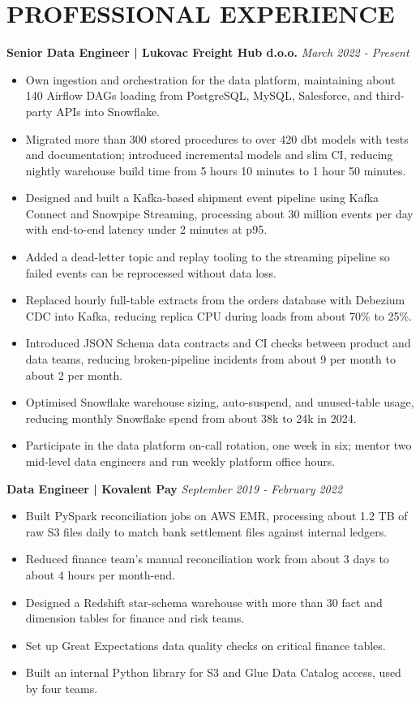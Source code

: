\documentclass[11pt,a4paper]{article}
\begin{document}
\section*{PROFESSIONAL EXPERIENCE}
\textbf{Senior Data Engineer | Lukovac Freight Hub d.o.o.} \hfill \textit{March 2022 - Present}
\begin{itemize}
\item Own ingestion and orchestration for the data platform, maintaining about 140 Airflow DAGs loading from PostgreSQL, MySQL, Salesforce, and third-party APIs into Snowflake.
\item Migrated more than 300 stored procedures to over 420 dbt models with tests and documentation; introduced incremental models and slim CI, reducing nightly warehouse build time from 5 hours 10 minutes to 1 hour 50 minutes.
\item Designed and built a Kafka-based shipment event pipeline using Kafka Connect and Snowpipe Streaming, processing about 30 million events per day with end-to-end latency under 2 minutes at p95.
\item Added a dead-letter topic and replay tooling to the streaming pipeline so failed events can be reprocessed without data loss.
\item Replaced hourly full-table extracts from the orders database with Debezium CDC into Kafka, reducing replica CPU during loads from about 70\% to 25\%.
\item Introduced JSON Schema data contracts and CI checks between product and data teams, reducing broken-pipeline incidents from about 9 per month to about 2 per month.
\item Optimised Snowflake warehouse sizing, auto-suspend, and unused-table usage, reducing monthly Snowflake spend from about 38k to 24k in 2024.
\item Participate in the data platform on-call rotation, one week in six; mentor two mid-level data engineers and run weekly platform office hours.
\end{itemize}

\textbf{Data Engineer | Kovalent Pay} \hfill \textit{September 2019 - February 2022}
\begin{itemize}
\item Built PySpark reconciliation jobs on AWS EMR, processing about 1.2 TB of raw S3 files daily to match bank settlement files against internal ledgers.
\item Reduced finance team's manual reconciliation work from about 3 days to about 4 hours per month-end.
\item Designed a Redshift star-schema warehouse with more than 30 fact and dimension tables for finance and risk teams.
\item Set up Great Expectations data quality checks on critical finance tables.
\item Built an internal Python library for S3 and Glue Data Catalog access, used by four teams.
\end{itemize}
\end{document}
